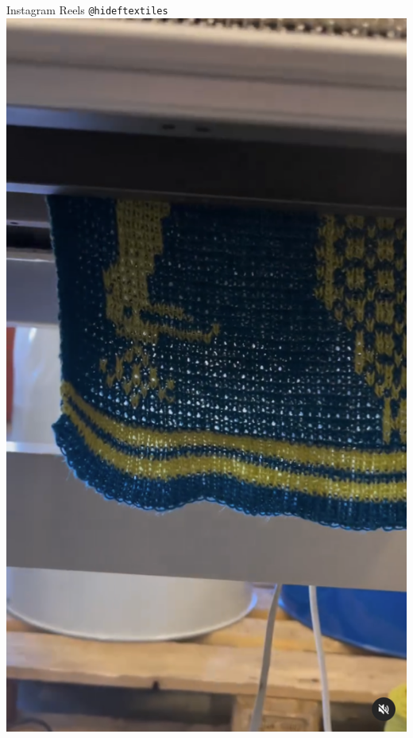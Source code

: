 \documentclass[
    NAME={Dr. Helga Ingimundardóttir},
    EMAIL={helgaingim@hi.is},
    FACULTY={Industrial Engineering},
    TITLE={HiDef Textiles: Reviving Tradition with Innovation},
    SUBTITLE={Empowering Creativity and Sustainability in Textile Production through Digital Transformation},
    SEMINAR={Reykjavík DataBeers},
    DATE={January 25, 2025},
    WIDE={true}
]{HI-LaTeX/hi-beamer}
\begin{document}
\begin{frame}{Instagram Reels \texttt{@hideftextiles}}
        \href{https://www.instagram.com/p/C7kbxeFIKz1/}{\includegraphics[height=0.8\textheight]{include/C9Cf8FFgDZZ.png}}

\end{frame}
\end{document}

